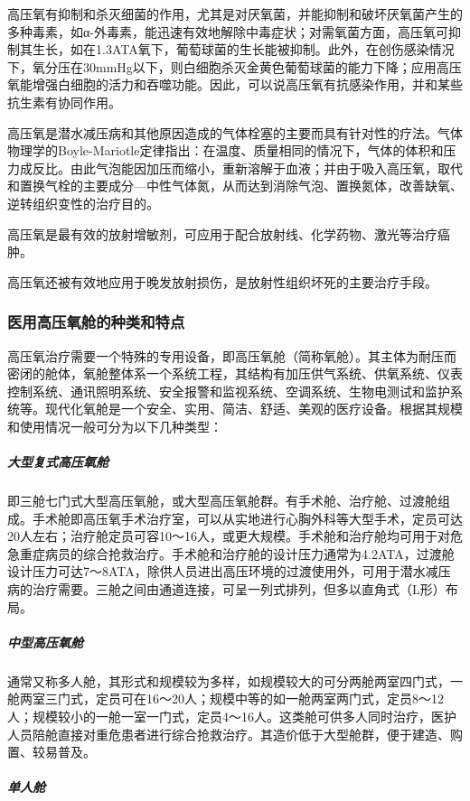 高压氧有抑制和杀灭细菌的作用，尤其是对厌氧菌，并能抑制和破坏厌氧菌产生的多种毒素，如α-外毒素，能迅速有效地解除中毒症状；对需氧菌方面，高压氧可抑制其生长，如在1.3ATA氧下，葡萄球菌的生长能被抑制。此外，在创伤感染情况下，氧分压在30mmHg以下，则白细胞杀灭金黄色葡萄球菌的能力下降；应用高压氧能增强白细胞的活力和吞噬功能。因此，可以说高压氧有抗感染作用，并和某些抗生素有协同作用。

高压氧是潜水减压病和其他原因造成的气体栓塞的主要而具有针对性的疗法。气体物理学的Boyle-Mariotle定律指出：在温度、质量相同的情况下，气体的体积和压力成反比。由此气泡能因加压而缩小，重新溶解于血液；并由于吸入高压氧，取代和置换气栓的主要成分---中性气体氮，从而达到消除气泡、置换氮体，改善缺氧、逆转组织变性的治疗目的。

高压氧是最有效的放射增敏剂，可应用于配合放射线、化学药物、激光等治疗癌肿。

高压氧还被有效地应用于晚发放射损伤，是放射性组织坏死的主要治疗手段。

\subsubsection{医用高压氧舱的种类和特点}

高压氧治疗需要一个特殊的专用设备，即高压氧舱（简称氧舱）。其主体为耐压而密闭的舱体，氧舱整体系一个系统工程，其结构有加压供气系统、供氧系统、仪表控制系统、通讯照明系统、安全报警和监视系统、空调系统、生物电测试和监护系统等。现代化氧舱是一个安全、实用、简洁、舒适、美观的医疗设备。根据其规模和使用情况一般可分为以下几种类型：

\subparagraph{大型复式高压氧舱}

即三舱七门式大型高压氧舱，或大型高压氧舱群。有手术舱、治疗舱、过渡舱组成。手术舱即高压氧手术治疗室，可以从实地进行心胸外科等大型手术，定员可达20人左右；治疗舱定员可容10～16人，或更大规模。手术舱和治疗舱均可用于对危急重症病员的综合抢救治疗。手术舱和治疗舱的设计压力通常为4.2ATA，过渡舱设计压力可达7～8ATA，除供人员进出高压环境的过渡使用外，可用于潜水减压病的治疗需要。三舱之间由通道连接，可呈一列式排列，但多以直角式（L形）布局。

\subparagraph{中型高压氧舱}

通常又称多人舱，其形式和规模较为多样，如规模较大的可分两舱两室四门式，一舱两室三门式，定员可在16～20人；规模中等的如一舱两室两门式，定员8～12人；规模较小的一舱一室一门式，定员4～16人。这类舱可供多人同时治疗，医护人员陪舱直接对重危患者进行综合抢救治疗。其造价低于大型舱群，便于建造、购置、较易普及。

\subparagraph{单人舱}

